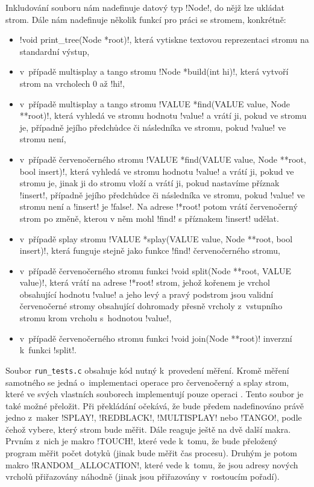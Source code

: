 Inkludování souboru nám nadefinuje datový typ !Node!, do nějž lze ukládat strom. Dále nám nadefinuje několik funkcí pro práci se stromem, konkrétně:

\begin{itemize}
\item !void print_tree(Node *root)!, která vytiskne textovou reprezentaci stromu na standardní výstup,
\item v~případě multisplay a tango stromu !Node *build(int hi)!, která vytvoří strom na vrcholech 0 až !hi!,
\item v~případě multisplay a tango stromu !VALUE *find(VALUE value, Node **root)!, která vyhledá ve stromu hodnotu !value! a vrátí ji, pokud ve stromu je, případně jejího předchůdce či následníka ve stromu, pokud !value! ve stromu není,
\item v~případě červenočerného stromu !VALUE *find(VALUE value, Node **root, bool insert)!, která vyhledá ve stromu hodnotu !value! a vrátí ji, pokud ve stromu je, jinak ji do stromu vloží a vrátí ji, pokud nastavíme příznak !insert!, případně jejího předchůdce či následníka ve stromu, pokud !value! ve stromu není a !insert! je !false!. Na adrese !*root! potom vrátí červenočerný strom po změně, kterou v něm mohl !find! s příznakem !insert! udělat.
\item v~případě splay stromu !VALUE *splay(VALUE value, Node **root, bool insert)!, která funguje stejně jako funkce !find! červenočerného stromu,
\item v~případě červenočerného stromu funkci !void split(Node **root, VALUE value)!, která vrátí na adrese !*root! strom, jehož kořenem je vrchol obsahující hodnotu !value! a jeho levý a pravý podstrom jsou validní červenočerné stromy obsahující dohromady přesně vrcholy z~vstupního stromu krom vrcholu s~hodnotou !value!,
\item v~případě červenočerného stromu funkci !void join(Node **root)! inverzní k~funkci !split!.
\end{itemize}

Soubor {\tt run_tests.c} obsahuje kód nutný k~provedení měření. Kromě měření
samotného se jedná o~implementaci operace  pro červenočerný a splay
strom, které ve svých vlastních souborech implementují pouze operaci
. Tento soubor je také možné přeložit. Při překládání očekává, že
bude předem nadefinováno právě jedno z~maker !SPLAY!, !REDBLACK!, !MULTISPLAY!
nebo !TANGO!, podle čehož vybere, který strom bude měřit. Dále reaguje ještě na
dvě další makra. Prvním z~nich je makro !TOUCH!, které vede k~tomu, že bude
přeložený program měřit počet dotyků (jinak bude měřit čas procesu). Druhým je
potom makro !RANDOM_ALLOCATION!, které vede k~tomu, že jsou adresy nových
vrcholů přiřazovány náhodně (jinak jsou přiřazovány v~rostoucím pořadí).

